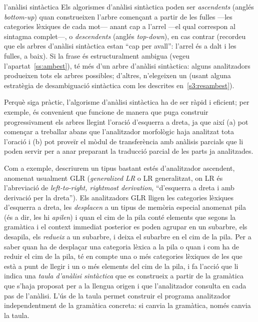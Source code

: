 \begin{persabermes}{l'anàlisi sintàctica}  
  Els algorismes d'anàlisi sintàctica poden ser {\em ascendents}
  (anglés \emph{bottom-up}) quan construeixen l'arbre començant a
  partir de les fulles ---les categories lèxiques de cada mot--- anant
  cap a l'arrel ---el qual correspon al sintagma complet---, o
  \emph{descendents} (anglés \emph{top-down}), en cas contrar
  (recordeu que els arbres d'anàlisi sintàctica estan ``cap per
  avall'': l'arrel és a dalt i les fulles, a baix). Si la frase és
  estructuralment ambigua (vegeu l'apartat~\ref{ss:ambest}), té més
  d'un arbre d'anàlisi sintàctica: alguns analitzadors produeixen tots
  els arbres possibles; d'altres, n'elegeixen un (usant alguna
  estratègia de desambiguació sintàctica com les descrites
  en~\ref{s3:resambest}).

  Perquè siga pràctic, l'algorisme d'anàlisi sintàctica ha de ser
  ràpid i eficient; per exemple, és convenient que funcione de manera
  que puga construir progressivament els arbres llegint l'oració
  d'esquerra a dreta, ja que així (a) pot començar a treballar abans
  que l'analitzador morfològic haja analitzat tota l'oració i (b) pot
  proveïr el mòdul de transferència amb anàlisis parcials que li poden
  servir per a anar preparant la traducció parcial de les parts ja
  analitzades.

  Com a exemple, descriurem un tipus bastant estés d'analitzador
  ascendent, anomenat usualment GLR (\emph{generalized LR} o LR
  generalitzat, on LR és l'abreviació de \emph{left-to-right,
    rightmost derivation}, ``d'esquerra a dreta i amb derivació per la
  dreta'').  Els analitzadors GLR lligen les categories lèxiques
  d'esquerra a dreta, les \emph{desplacen} a un tipus de memòria
  especial anomenat pila (és a dir, les hi \emph{apilen}) i quan el
  cim de la pila conté elements que segons la gramàtica i el context
  immediat posterior es poden agrupar en un subarbre, els desapila,
  els \emph{redueix} a un subarbre, i deixa el subarbre en el cim de
  la pila. Per a saber quan ha de desplaçar una categoria lèxica a la
  pila o quan i com ha de reduir el cim de la pila, té en compte una o
  més categories lèxiques de les que està a punt de llegir i un o més
  elements del cim de la pila, i fa l'acció que li indica una
  \emph{taula d'anàlisi sintàctica} que es construeix a partir de la
  gramàtica que s'haja proposat per a la llengua origen i que
  l'analitzador consulta en cada pas de l'anàlisi. L'ús de la taula
  permet construir el programa analitzador independentment de la
  gramàtica concreta: si canvia la gramàtica, només canvia la taula.


\end{persabermes}
